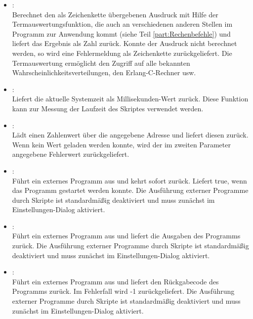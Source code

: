 \begin{itemize}

\item
{}:\\
Berechnet den als Zeichenkette übergebenen Ausdruck mit Hilfe der Termauswertungsfunktion, die
auch an verschiedenen anderen Stellen im Programm zur Anwendung kommt (siehe Teil \ref{part:Rechenbefehle})	
und liefert das Ergebnis   als Zahl zurück. Konnte der Ausdruck nicht berechnet werden, so wird eine Fehlermeldung als
Zeichenkette zurückgeliefert. Die Termauswertung ermöglicht den Zugriff auf alle bekannten
Wahrscheinlichkeitsverteilungen, den Erlang-C-Rechner usw.

\item
{}:\\
Liefert die aktuelle Systemzeit als Millisekunden-Wert zurück. Diese Funktion kann zur Messung der
Laufzeit des Skriptes verwendet werden.

\item
{}:\\
Lädt einen Zahlenwert über die angegebene Adresse und liefert diesen zurück.
Wenn kein Wert geladen werden konnte, wird der im zweiten Parameter angegebene
Fehlerwert zurückgeliefert.

\item
{}:\\
Führt ein externes Programm aus und kehrt sofort zurück. Liefert true, wenn das Programm gestartet werden konnte.
Die Ausführung externer Programme durch Skripte ist standardmäßig deaktiviert
und muss zunächst im Einstellungen-Dialog aktiviert.

\item
{}:\\
Führt ein externes Programm aus und liefert die Ausgaben des Programms zurück.
Die Ausführung externer Programme durch Skripte ist standardmäßig deaktiviert
und muss zunächst im Einstellungen-Dialog aktiviert.

\item
{}:\\
Führt ein externes Programm aus und liefert den Rückgabecode des Programms zurück.
Im Fehlerfall wird -1 zurückgeliefert.
Die Ausführung externer Programme durch Skripte ist standardmäßig deaktiviert
und muss zunächst im Einstellungen-Dialog aktiviert.


\end{itemize}
